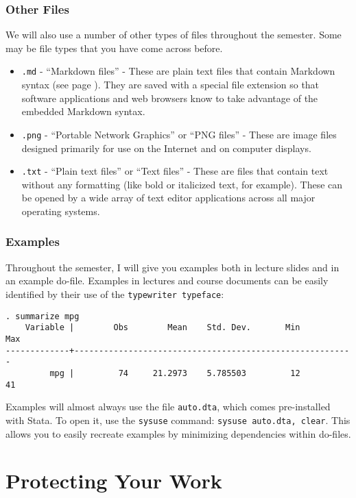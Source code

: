 \documentclass[]{book}
\begin{document}
\subsection{Other Files}\label{other-files}

We will also use a number of other types of files throughout the
semester. Some may be file types that you have come across before.

\begin{itemize}
\item
  \texttt{.md} - ``Markdown files'' - These are plain text files that
  contain Markdown syntax (see page ). They are saved with a special
  file extension so that software applications and web browsers know to
  take advantage of the embedded Markdown syntax.
\item
  \texttt{.png} - ``Portable Network Graphics'' or ``PNG files'' - These
  are image files designed primarily for use on the Internet and on
  computer displays.
\item
  \texttt{.txt} - ``Plain text files'' or ``Text files'' - These are
  files that contain text without any formatting (like bold or
  italicized text, for example). These can be opened by a wide array of
  text editor applications across all major operating systems.
\end{itemize}

\subsection{Examples}\label{examples}

Throughout the semester, I will give you examples both in lecture slides
and in an example do-file. Examples in lectures and course documents can
be easily identified by their use of the \texttt{typewriter\ typeface}:

\begin{verbatim}
. summarize mpg
    Variable |        Obs        Mean    Std. Dev.       Min        Max
-------------+---------------------------------------------------------
         mpg |         74     21.2973    5.785503         12         41
\end{verbatim}

Examples will almost always use the file \texttt{auto.dta}, which comes
pre-installed with Stata. To open it, use the \texttt{sysuse} command:
\texttt{sysuse\ auto.dta,\ clear}. This allows you to easily recreate
examples by minimizing dependencies within do-files.

\chapter{Protecting Your Work}\label{protecting-your-work}
\end{document}

